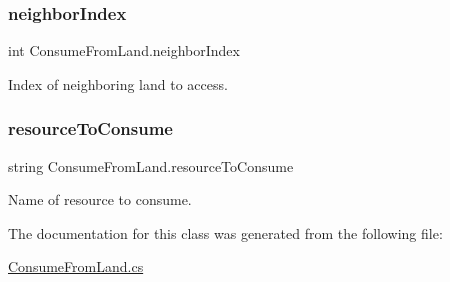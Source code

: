 \subsubsection{\texorpdfstring{neighbor\+Index}{neighborIndex}}
{\footnotesize\ttfamily int Consume\+From\+Land.\+neighbor\+Index}



Index of neighboring land to access. 

\mbox{\label{class_consume_from_land_a4ef240b29ec3b427fca36c8de1fed24b}} 
\subsubsection{\texorpdfstring{resource\+To\+Consume}{resourceToConsume}}
{\footnotesize\ttfamily string Consume\+From\+Land.\+resource\+To\+Consume}



Name of resource to consume. 



The documentation for this class was generated from the following file\+:\begin{DoxyCompactItemize}
\item 
\mbox{\hyperlink{_consume_from_land_8cs}{Consume\+From\+Land.\+cs}}\end{DoxyCompactItemize}
